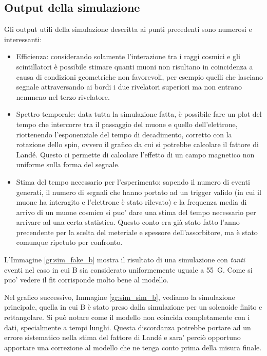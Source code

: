 \subsection{Output della simulazione}
Gli output utili della simulazione descritta ai punti precedenti sono numerosi e interessanti:
\begin{itemize}
\item Efficienza: considerando solamente l'interazione tra i raggi cosmici e gli scintillatori è possibile stimare quanti muoni non risultano in coincidenza a causa
di condizioni geometriche non favorevoli, per esempio quelli che lasciano segnale attraversando ai bordi i due rivelatori superiori ma non entrano nemmeno nel terzo
rivelatore.
\item Spettro temporale: data tutta la simulazione fatta, è possibile fare un plot del tempo che intercorre tra il passaggio del muone e quello dell'elettrone, riottenendo
l'esponenziale del tempo di decadimento, corretto con la rotazione dello spin, ovvero il grafico da cui si potrebbe calcolare il fattore di Land\'e. Questo ci permette di calcolare l'effetto di un campo magnetico non uniforme sulla forma del segnale.
\item Stima del tempo necessario per l'esperimento: sapendo il numero di eventi generati, il numero di segnali che hanno portato ad un trigger valido (in cui il muone ha interagito e l'elettrone \`e stato rilevato) e la frequenza media di arrivo di un muone cosmico si puo' dare una stima del tempo necessario per arrivare ad una certa statistica. Questo conto era gi\`a stato fatto l'anno precendente per la scelta del meteriale e spessore dell'assorbitore, ma \`e stato comunque ripetuto per confronto.
\end{itemize}




L'Immagine \ref{gr:sim_fake_b} mostra il risultato di una simulazione con \textit{tanti} eventi nel caso in cui B sia considerato uniformemente uguale a 55~G. Come si puo' vedere il fit corrisponde molto bene al modello.

Nel grafico successivo, Immagine \ref{gr:sim_sim_b}, vediamo la simulazione principale, quella in cui B \`e stato preso dalla simulazione per un solenoide finito e rettangolare. Si pu\`o notare come il modello non coincida completamente con i dati, specialmente a tempi lunghi. Questa discordanza potrebbe portare ad un errore sistematico nella stima del fattore di Land\'e e sara' perci\`o opportuno apportare una correzione al modello che ne tenga conto prima della misura finale.

